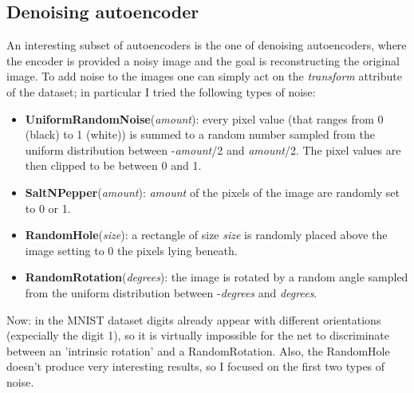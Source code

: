 \documentclass[a4paper, 11pt]{article}
\begin{document}
  \subsection{Denoising autoencoder}
    An interesting subset of autoencoders is the one of denoising autoencoders, where the encoder is provided a noisy image and the goal is reconstructing the original image. To add noise to the images one can simply act on the \emph{transform} attribute of the dataset; in particular I tried the following types of noise:

    \begin{itemize}
      \item \textbf{UniformRandomNoise}(\emph{amount}): every pixel value (that ranges from 0 (black) to 1 (white)) is summed to a random number sampled from the uniform distribution between -\emph{amount}/2 and \emph{amount}/2. The pixel values are then clipped to be between 0 and 1.
      \item \textbf{SaltNPepper}(\emph{amount}): \emph{amount} of the pixels of the image are randomly set to 0 or 1.
      \item \textbf{RandomHole}(\emph{size}): a rectangle of size \emph{size} is randomly placed above the image setting to 0 the pixels lying beneath.
      \item \textbf{RandomRotation}(\emph{degrees}): the image is rotated by a random angle sampled from the uniform distribution between -\emph{degrees} and \emph{degrees}.
    \end{itemize}

    Now: in the MNIST dataset digits already appear with different orientations (expecially the digit 1), so it is virtually impossible for the net to discriminate between an 'intrinsic rotation' and a RandomRotation. Also, the RandomHole doesn't produce very interesting results, so I focused on the first two types of noise.
\end{document}
